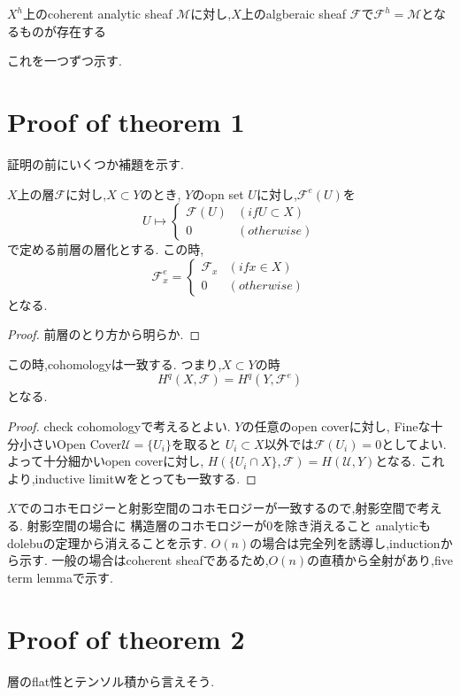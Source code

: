 \begin{thm}
$X^h$上のcoherent analytic sheaf $\mathcal{M}$に対し,$X$上のalgberaic sheaf $\mathcal{F}$で$\mathcal{F}^h = \mathcal{M}$となるものが存在する
\end{thm}

これを一つずつ示す.

\section{Proof of theorem 1}
証明の前にいくつか補題を示す.

\begin{lem}
$X$上の層$\mathcal{F}$に対し,$X \subset Y$のとき,
$Y$のopn set $U$に対し,$\mathcal{F}^e(U)$を
\begin{equation*}
  U \mapsto \begin{cases}
    \mathcal{F}(U) & (if U \subset X) \\
    0 & (otherwise)
\end{cases}
\end{equation*}
で定める前層の層化とする.
この時,
\begin{equation*}
\mathcal{F}^e_x =
\begin{cases}
    \mathcal{F}_x & (if x \in X) \\
    0 & (otherwise)
\end{cases}
\end{equation*}
となる.
\end{lem}
\begin{proof}
前層のとり方から明らか.
\end{proof}

\begin{lem}
この時,cohomologyは一致する.
つまり,$X \subset Y$の時
\begin{equation*}
 H^q(X, \mathcal{F}) = H^q(Y, \mathcal{F}^e)
\end{equation*}
となる.
\end{lem}
\begin{proof}
check cohomologyで考えるとよい.
$Y$の任意のopen coverに対し,
Fineな十分小さいOpen Cover$\mathcal{U} = \{U_i\}$を取ると
$U_i \subset X$以外では$\mathcal{F}(U_i) = 0$としてよい.
よって十分細かいopen coverに対し,
$H(\{U_i \cap X\}, \mathcal{F}) = H(\mathcal{U}, Y)$となる.
これより,inductive limitｗをとっても一致する.
\end{proof}

$X$でのコホモロジーと射影空間のコホモロジーが一致するので,射影空間で考える.
射影空間の場合に
構造層のコホモロジーが$0$を除き消えること
analyticもdolebuの定理から消えることを示す.
$O(n)$の場合は完全列を誘導し,inductionから示す.
一般の場合はcoherent sheafであるため,$O(n)$の直積から全射があり,five term lemmaで示す.

\section{Proof of theorem 2}
層のflat性とテンソル積から言えそう.
